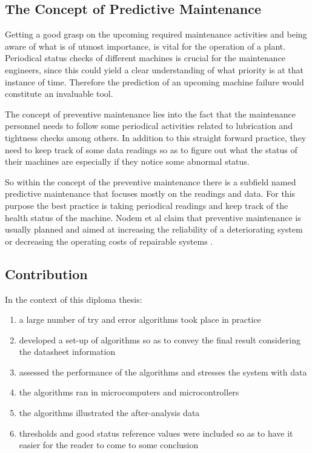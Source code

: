 \subsection{The Concept of Predictive Maintenance}
{
Getting a good grasp on the upcoming required maintenance activities and being aware of what is of utmost importance, is vital for the operation of a plant. Periodical status checks of different machines is crucial for the maintenance engineers, since this could yield a clear understanding of what priority is at that instance of time. Therefore the prediction of an upcoming machine failure would constitute an invaluable tool.

The concept of preventive maintenance lies into the fact that the maintenance personnel needs to follow some periodical activities related to lubrication and tightness checks among others. In addition to this straight forward practice, they need to keep track of some data readings so as to figure out what the status of their machines are especially if they notice some abnormal status. 

So within the concept of the preventive maintenance there is a subfield named predictive maintenance that focuses mostly on the readings and data. For this purpose the best practice is taking periodical readings and keep track of the health status of the machine. Nodem et al claim that preventive maintenance is usually planned and aimed at increasing the reliability of a deteriorating system or decreasing the operating costs of repairable systems \cite{DehayemNodem2011}.
}

\subsection{Contribution}
{
In the context of this diploma thesis:
\begin{enumerate}
\item a large number of try and error algorithms took place in practice
\item developed a set-up of algorithms so as to convey the final result considering the datasheet information
\item assessed the performance of the algorithms and stresses the system with data
\item the algorithms ran in microcomputers and microcontrollers
\item the algorithms illustrated the after-analysis data
\item thresholds and good status reference values were included so as to have it easier for the reader to come to some conclusion
\end{enumerate}
}


